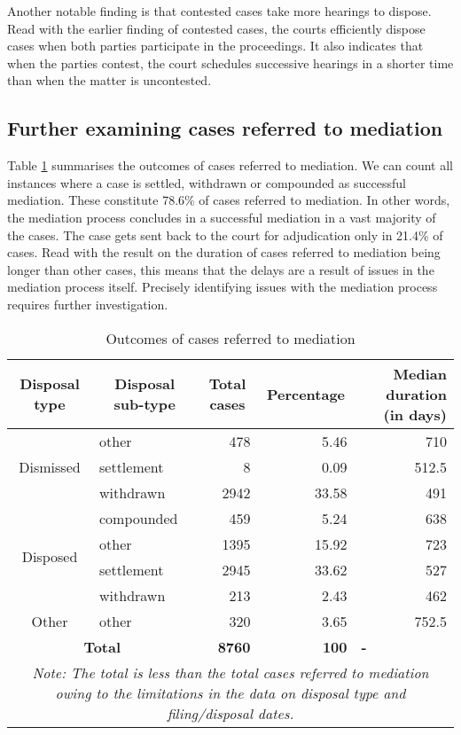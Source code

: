 Another notable finding is that contested cases take more hearings to dispose. Read with the earlier finding of contested cases, the courts efficiently dispose cases when both parties participate in the proceedings. It also indicates that when the parties contest, the court schedules successive hearings in a shorter time than when the matter is uncontested.

\subsection{Further examining cases referred to mediation}
\label{sec:furth-exam-cases}
Table \ref{tab:mediation} summarises the outcomes of cases referred to mediation. We can count all instances where a case is settled, withdrawn or compounded as successful mediation. These constitute 78.6\% of cases referred to mediation. In other words, the mediation process concludes in a successful mediation in a vast majority of the cases. The case gets sent back to the court for adjudication only in 21.4\% of cases. Read with the result on the duration of cases referred to mediation being longer than other cases, this means that the delays are a result of issues in the mediation process itself. Precisely identifying issues with the mediation process requires further investigation.

{\footnotesize \begin{longtable}{@{}clrrr@{}}
\caption{Outcomes of cases referred to mediation}
\label{tab:mediation}\\
\toprule
  \textbf{Disposal type} & \multicolumn{1}{c}{\textbf{Disposal sub-type}} & \multicolumn{1}{c}{\textbf{Total cases}} & \multicolumn{1}{c}{\textbf{Percentage}} & \multicolumn{1}{p{3cm}}{\textbf{Median duration (in days)}} \\
  \midrule
\endhead
\multirow{3}{*}{Dismissed} & other & 478 & 5.46 & 710 \\
 & settlement & 8 & 0.09 & 512.5 \\
 & withdrawn & 2942 & 33.58 & 491 \\
 \midrule
\multirow{4}{*}{Disposed} & compounded & 459 & 5.24 & 638 \\
 & other & 1395 & 15.92 & 723 \\
 & settlement & 2945 & 33.62 & 527 \\
 & withdrawn & 213 & 2.43 & 462 \\
 \midrule
 Other & other & 320 & 3.65 & 752.5 \\
 \midrule
 \multicolumn{2}{c}{\textbf{Total}} & \textbf{8760} & \textbf{100} & \multicolumn{1}{l}{\textbf{-}} \\
 \bottomrule
 \multicolumn{5}{p{11cm}}{{\footnotesize \emph{Note: The total is less than the total cases referred to mediation owing to the limitations in the data on disposal type and filing/disposal dates.}}}
\end{longtable}}

